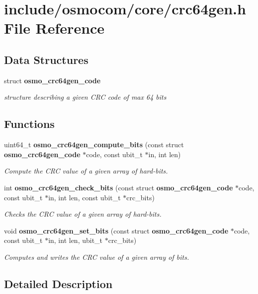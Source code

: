 \section{include/osmocom/core/crc64gen.h File Reference}
\label{crc64gen_8h}
\subsection*{Data Structures}
\begin{DoxyCompactItemize}
\item 
struct {\bf osmo\_\-crc64gen\_\-code}
\begin{DoxyCompactList}\small\item\em structure describing a given CRC code of max 64 bits \item\end{DoxyCompactList}\end{DoxyCompactItemize}
\subsection*{Functions}
\begin{DoxyCompactItemize}
\item 
uint64\_\-t {\bf osmo\_\-crc64gen\_\-compute\_\-bits} (const struct {\bf osmo\_\-crc64gen\_\-code} $\ast$code, const ubit\_\-t $\ast$in, int len)
\begin{DoxyCompactList}\small\item\em Compute the CRC value of a given array of hard-\/bits. \item\end{DoxyCompactList}\item 
int {\bf osmo\_\-crc64gen\_\-check\_\-bits} (const struct {\bf osmo\_\-crc64gen\_\-code} $\ast$code, const ubit\_\-t $\ast$in, int len, const ubit\_\-t $\ast$crc\_\-bits)
\begin{DoxyCompactList}\small\item\em Checks the CRC value of a given array of hard-\/bits. \item\end{DoxyCompactList}\item 
void {\bf osmo\_\-crc64gen\_\-set\_\-bits} (const struct {\bf osmo\_\-crc64gen\_\-code} $\ast$code, const ubit\_\-t $\ast$in, int len, ubit\_\-t $\ast$crc\_\-bits)
\begin{DoxyCompactList}\small\item\em Computes and writes the CRC value of a given array of bits. \item\end{DoxyCompactList}\end{DoxyCompactItemize}


\subsection{Detailed Description}
